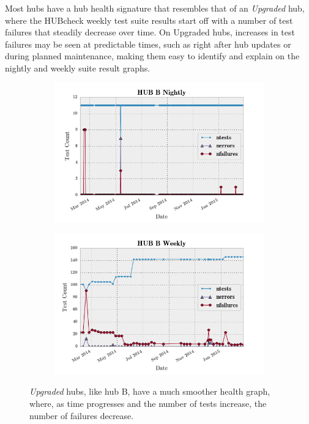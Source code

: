 Most hubs have a hub health signature that resembles that of an
\textit{Upgraded} hub, where the HUBcheck weekly test suite results start off
with a number of test failures that steadily decrease over time. On
Upgraded hubs, increases in test failures may be seen at predictable
times, such as right after hub updates or during planned maintenance, making them
easy to identify and explain on the nightly and weekly suite result graphs.

\begin{figure}[ht!]
        \centering
        \begin{subfigure}[b]{0.65\textwidth}
                \centering
                \includegraphics[width=\textwidth]{../../images/summary_plots/hub_b_nightly.png}
        \end{subfigure}
        \begin{subfigure}[b]{0.65\textwidth}
                \centering
                \includegraphics[width=\textwidth]{../../images/summary_plots/hub_b_weekly.png}
        \end{subfigure}
        \caption{ \textit{Upgraded} hubs, like hub B, have a much
                  smoother health graph, where, as time progresses
                  and the number of tests increase, the number of
                  failures decrease. }
        \label{fig:hub_b_health_plots}
\end{figure}

